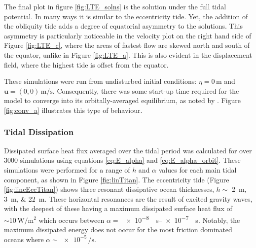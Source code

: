 The final plot in figure \ref{fig:LTE_solns} is the solution under the full tidal potential. In many ways it is similar to the eccentricity tide. Yet, the addition of the obliquity tide adds a degree of equatorial asymmetry to the solutions. This asymmetry is particularly noticeable in the velocity plot on the right hand side of Figure \ref{fig:LTE_c}, where the areas of fastest flow are skewed north and south of the equator, unlike in Figure \ref{fig:LTE_a}. This is also evident in the displacement field, where the highest tide is offset from the equator.

These simulations were run from undisturbed initial conditions: \hbox{$\eta = 0 \, \si{\metre}$} and \hbox{$\bm{u} = (0,0) \, \si{\metre\per\second}$}. Consequently, there was some start-up time required for the model to converge into its orbitally-averaged equilibrium, as noted by \citet{sears1995tidal}. Figure \ref{fig:conv_a} illustrates this type of behaviour.



\subsubsection{Tidal Dissipation \label{subsubsec:linTitan}}

Dissipated surface heat flux averaged over the tidal period was calculated for over 3000 simulations using equations \ref{eq:E_alpha} and \ref{eq:E_alpha_orbit}. These simulations were performed for a range of $h$ and $\alpha$ values for each main tidal component, as shown in Figure \ref{fig:linTitan}. The eccentricity tide (Figure \ref{fig:lincEccTitan}) shows three resonant dissipative ocean thicknesses, $h \sim$ \SIlist{2;3;22}{\metre}. These horizontal resonances are the result of excited gravity waves, with the deepest of these having a maximum dissipated surface heat flux of $\sim 10\, \si{\watt\per\square\metre}$ which occurs between $\alpha =$ \SIrange{e-8}{e-7}{\per\second}. Notably, the maximum dissipated energy does not occur for the most friction dominated oceans where $\alpha \sim \num{e-5} \, \si{\per\second}$. 


